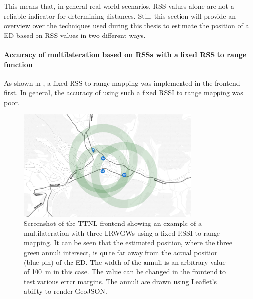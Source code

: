 This means that, in general real-world scenarios, \ac{RSS} values alone are not a reliable indicator for determining distances.
Still, this section will provide an overview over the techniques used during this thesis to estimate the position of a \acl{ED} based on \ac{RSS} values in two different ways.

\paragraph{Accuracy of multilateration based on \aclp{RSS} with a fixed \acl{RSS} to range function}\label{subsubsec:conclusion-rssi-fixed-scale}

As shown in , a fixed \ac{RSS} to range mapping was implemented in the frontend first.
In general, the accuracy of using such a fixed \ac{RSSI} to range mapping was poor.

\begin{figure}[htbp]
    \centering
    \includegraphics[width=0.8\textwidth]{pictures/ttn-locator/frontend/multilateration/rssi_range_multilateration_bad_example.png}
    \caption[Screenshot of the \acl{TTNL} frontend showing an example of a multilateration using a fixed \acl{RSSI} to range mapping]{
        Screenshot of the \ac{TTNL} frontend showing an example of a multilateration with three \aclp{LRWGW} using a fixed \ac{RSSI} to range mapping.
        It can be seen that the estimated position, where the three green annuli intersect, is quite far away from the actual position (blue pin) of the \acl{ED}.
        The width of the annuli is an arbitrary value of \SI{100}{\meter} in this case.
        The value can be changed in the frontend to test various error margins.
        The annuli are drawn using Leaflet's ability to render GeoJSON.\@
    }\label{pic:bad-rssi-to-range-multilateration-example}
\end{figure}

